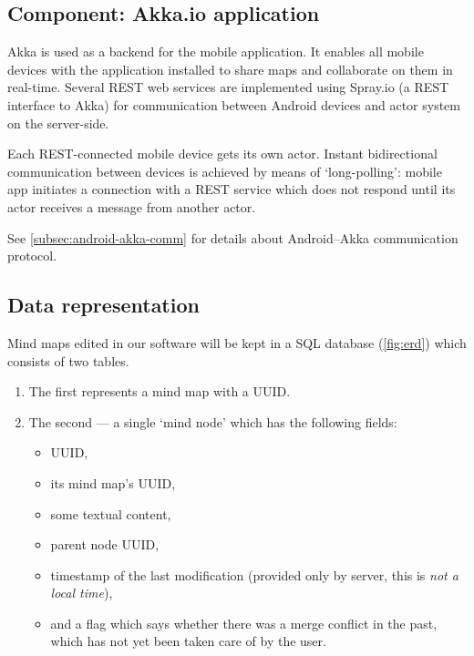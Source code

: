 
\subsection{Component: Akka.io application}
\label{subsec:component-akka}


Akka is used as a backend for the mobile application. It enables all mobile devices with the application installed to share maps and collaborate on them in real-time. Several REST web services are implemented using Spray.io (a REST interface to Akka) for communication between Android devices and actor system on the server-side.

Each REST-connected mobile device gets its own actor. Instant bidirectional communication between devices is achieved by means of `long-polling': mobile app initiates a connection with a REST service which does not respond until its actor receives a message from another actor.

See \cref{subsec:android-akka-comm} for details about Android--Akka communication protocol.



\subsection{Data representation}
\label{subsec:data-repr}

Mind maps edited in our software will be kept in a SQL database (\cref{fig:erd}) which consists of two tables.

\begin{enumerate}
	\item The first represents a mind map with a UUID.
	\item The second --- a single `mind node' which has the following fields: \begin{itemize}
		\item UUID,
		\item its mind map's UUID,
		\item some textual content,
		\item parent node UUID,
		\item timestamp of the last modification (provided only by server, this is \emph{not a local time}),
		\item and a flag which says whether there was a merge conflict in the past, which has not yet been taken care of by the user.
	\end{itemize}
\end{enumerate}

